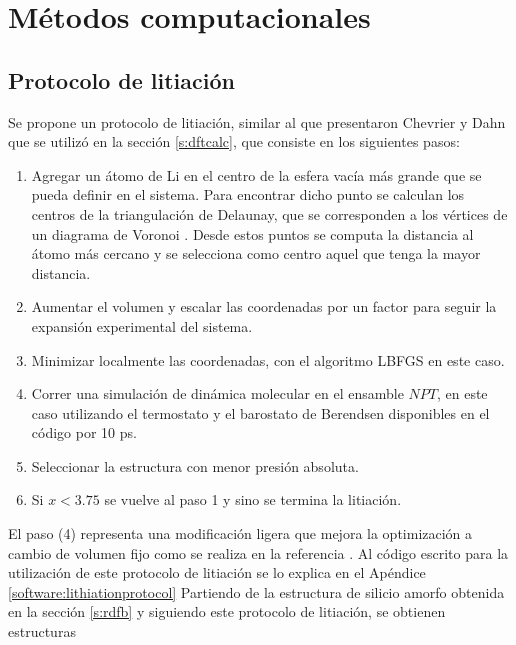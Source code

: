 \section{Métodos computacionales}

\subsection{Protocolo de litiación}\label{s:litpro}

Se propone un protocolo de litiación, similar al que presentaron Chevrier y Dahn
\cite{chevrier2009} que se utilizó en la sección \ref{s:dftcalc}, que consiste 
en los siguientes pasos:
\begin{enumerate}
    \item Agregar un átomo de Li en el centro de la esfera vacía más grande que se pueda definir en el sistema.
        Para encontrar dicho punto se calculan los centros de la triangulación 
        de Delaunay, que se corresponden a los vértices de un diagrama de 
        Voronoi \cite{aurenhammer1991}. Desde estos puntos se computa la 
        distancia al átomo más cercano y se selecciona como centro aquel que 
        tenga la mayor distancia. 
    \item Aumentar  el volumen y escalar las coordenadas por un factor para
        seguir la expansión experimental del sistema.
    \item Minimizar localmente las coordenadas, con el algoritmo LBFGS \cite{liu1989} en este caso.
    \item Correr una simulación de dinámica molecular en el ensamble $NPT$, en 
        este caso utilizando el termostato y el barostato de Berendsen \cite{berendsen1984} 
        disponibles en el código  \cite{dftb+} por 10 ps. 
    \item Seleccionar la estructura con menor presión absoluta.
    \item Si $x < 3.75$ se vuelve al paso 1 y sino se termina la litiación.
\end{enumerate}
El paso (4) representa una modificación ligera que mejora la optimización a 
cambio de volumen fijo como se realiza en la referencia \cite{chevrier2009}.
Al código escrito para la utilización de este protocolo de litiación se lo 
explica en el Apéndice \ref{software:lithiationprotocol}
Partiendo de la estructura de silicio amorfo obtenida en la sección 
\ref{s:rdfb} y siguiendo este protocolo de litiación, se obtienen estructuras
